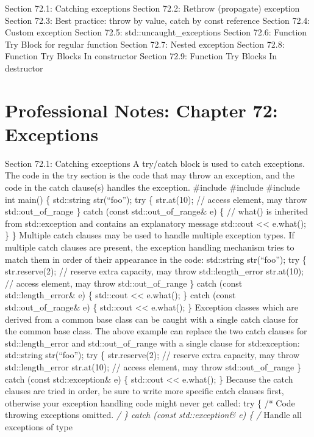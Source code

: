 Section 72.1: Catching exceptions Section 72.2: Rethrow (propagate)
exception Section 72.3: Best practice: throw by value, catch by const
reference Section 72.4: Custom exception Section 72.5:
std::uncaught\_exceptions Section 72.6: Function Try Block for regular
function Section 72.7: Nested exception Section 72.8: Function Try
Blocks In constructor Section 72.9: Function Try Blocks In destructor

\hypertarget{professional-notes-chapter-72-exceptions-1}{%
\chapter{Professional Notes: Chapter 72:
Exceptions}\label{professional-notes-chapter-72-exceptions-1}}

Section 72.1: Catching exceptions A try/catch block is used to catch
exceptions. The code in the try section is the code that may throw an
exception, and the code in the catch clause(s) handles the exception.
\#include \#include \#include int main() \{ std::string str(``foo'');
try \{ str.at(10); // access element, may throw std::out\_of\_range \}
catch (const std::out\_of\_range\& e) \{ // what() is inherited from
std::exception and contains an explanatory message std::cout
\textless\textless{} e.what(); \} \} Multiple catch clauses may be used
to handle multiple exception types. If multiple catch clauses are
present, the exception handling mechanism tries to match them in order
of their appearance in the code: std::string str(``foo''); try \{
str.reserve(2); // reserve extra capacity, may throw std::length\_error
str.at(10); // access element, may throw std::out\_of\_range \} catch
(const std::length\_error\& e) \{ std::cout \textless\textless{}
e.what(); \} catch (const std::out\_of\_range\& e) \{ std::cout
\textless\textless{} e.what(); \} Exception classes which are derived
from a common base class can be caught with a single catch clause for
the common base class. The above example can replace the two catch
clauses for std::length\_error and std::out\_of\_range with a single
clause for std:exception: std::string str(``foo''); try \{
str.reserve(2); // reserve extra capacity, may throw std::length\_error
str.at(10); // access element, may throw std::out\_of\_range \} catch
(const std::exception\& e) \{ std::cout \textless\textless{} e.what();
\} Because the catch clauses are tried in order, be sure to write more
speciﬁc catch clauses ﬁrst, otherwise your exception handling code might
never get called: try \{ /* Code throwing exceptions omitted. \emph{/ \}
catch (const std::exception\& e) \{ /} Handle all exceptions of type
